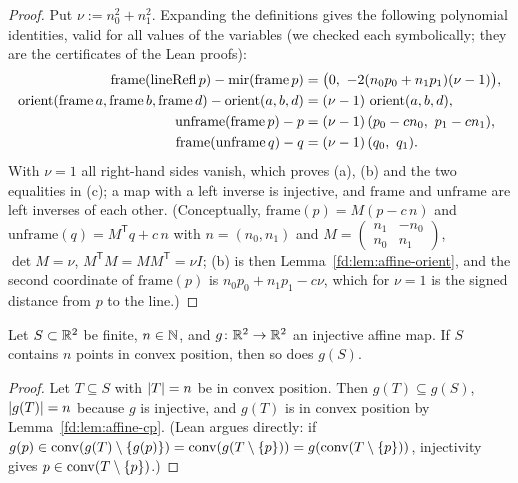 \begin{proof}
Put $\nu:=n_0^2+n_1^2$. Expanding the definitions gives the following polynomial identities, valid for all values of the
variables (we checked each symbolically; they are the  certificates of the Lean proofs):
\begin{align*}
\mathrm{frame}(\mathrm{lineRefl}\,p)-\operatorname{mir}(\mathrm{frame}\,p)&=\bigl(0,\ -2(n_0p_0+n_1p_1)(\nu-1)\bigr),\\
\orient(\mathrm{frame}\,a,\mathrm{frame}\,b,\mathrm{frame}\,d)-\orient(a,b,d)&=(\nu-1)\,\orient(a,b,d),\\
\mathrm{unframe}(\mathrm{frame}\,p)-p&=(\nu-1)\,(p_0-cn_0,\ p_1-cn_1),\\
\mathrm{frame}(\mathrm{unframe}\,q)-q&=(\nu-1)\,(q_0,\ q_1).
\end{align*}
With $\nu=1$ all right-hand sides vanish, which proves (a), (b) and the two equalities in (c); a map with a left inverse
is injective, and $\mathrm{frame}$ and $\mathrm{unframe}$ are left inverses of each other. (Conceptually,
$\mathrm{frame}(p)=M(p-c\,n)$ and $\mathrm{unframe}(q)=M^{\mathsf T}q+c\,n$ with $n=(n_0,n_1)$ and
$M=\left(\begin{smallmatrix}n_1&-n_0\\ n_0&n_1\end{smallmatrix}\right)$, $\det M=\nu$, $M^{\mathsf T}M=MM^{\mathsf T}=\nu I$;
(b) is then Lemma~\ref{fd:lem:affine-orient}, and the second coordinate of $\mathrm{frame}(p)$ is $n_0p_0+n_1p_1-c\nu$,
which for $\nu=1$ is the signed distance from $p$ to the line.)
\end{proof}

\begin{lemma}\label{mb:lem:affine}
Let $S\subset\mathbb R^2$ be finite, $n\in\mathbb N$, and $g\colon\mathbb R^2\to\mathbb R^2$ an injective affine map. If $S$ contains $n$ points in
convex position, then so does $g(S)$.
\end{lemma}

\begin{proof}
Let $T\subseteq S$ with $\lvert T\rvert=n$ be in convex position. Then $g(T)\subseteq g(S)$, $\lvert g(T)\rvert=n$ because $g$ is
injective, and $g(T)$ is in convex position by Lemma~\ref{fd:lem:affine-cp}. (Lean argues directly: if
$g(p)\in\operatorname{conv}(g(T)\setminus\{g(p)\})=\operatorname{conv}(g(T\setminus\{p\}))=g(\operatorname{conv}(T\setminus\{p\}))$, injectivity gives
$p\in\operatorname{conv}(T\setminus\{p\})$.)
\end{proof}

